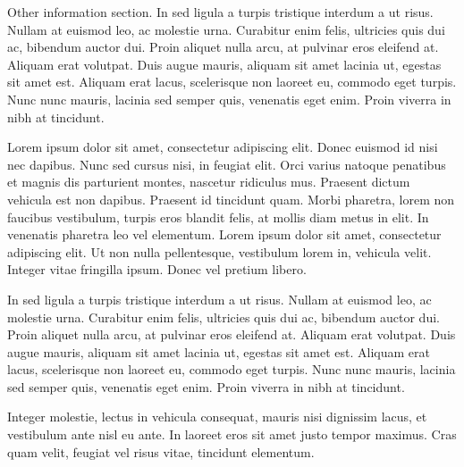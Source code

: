 \documentclass[letterpaper]{twentyonesecondcv} %
\begin{document}
{Other information section. In sed ligula a turpis tristique interdum a ut risus. Nullam at euismod leo, ac molestie urna. Curabitur enim felis, ultricies quis dui ac, bibendum auctor dui. Proin aliquet nulla arcu, at pulvinar eros eleifend at. Aliquam erat volutpat. Duis augue mauris, aliquam sit amet lacinia ut, egestas sit amet est. Aliquam erat lacus, scelerisque non laoreet eu, commodo eget turpis. Nunc nunc mauris, lacinia sed semper quis, venenatis eget enim. Proin viverra in nibh at tincidunt.

Lorem ipsum dolor sit amet, consectetur adipiscing elit. Donec euismod id nisi nec dapibus. Nunc sed cursus nisi, in feugiat elit. Orci varius natoque penatibus et magnis dis parturient montes, nascetur ridiculus mus. Praesent dictum vehicula est non dapibus. Praesent id tincidunt quam. Morbi pharetra, lorem non faucibus vestibulum, turpis eros blandit felis, at mollis diam metus in elit. In venenatis pharetra leo vel elementum. Lorem ipsum dolor sit amet, consectetur adipiscing elit. Ut non nulla pellentesque, vestibulum lorem in, vehicula velit. Integer vitae fringilla ipsum. Donec vel pretium libero.

In sed ligula a turpis tristique interdum a ut risus. Nullam at euismod leo, ac molestie urna. Curabitur enim felis, ultricies quis dui ac, bibendum auctor dui. Proin aliquet nulla arcu, at pulvinar eros eleifend at. Aliquam erat volutpat. Duis augue mauris, aliquam sit amet lacinia ut, egestas sit amet est. Aliquam erat lacus, scelerisque non laoreet eu, commodo eget turpis. Nunc nunc mauris, lacinia sed semper quis, venenatis eget enim. Proin viverra in nibh at tincidunt.

Integer molestie, lectus in vehicula consequat, mauris nisi dignissim lacus, et vestibulum ante nisl eu ante. In laoreet eros sit amet justo tempor maximus. Cras quam velit, feugiat vel risus vitae, tincidunt elementum.
}
\end{document}
